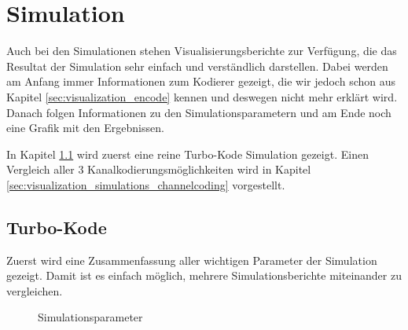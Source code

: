 \section{Simulation}
\label{sec:visualization_simulation}
Auch bei den Simulationen stehen Visualisierungsberichte zur Verfügung, die das Resultat der Simulation sehr einfach und verständlich darstellen. Dabei werden am Anfang immer Informationen zum Kodierer gezeigt, die wir jedoch schon aus Kapitel \ref{sec:visualization_encode} kennen und deswegen nicht mehr erklärt wird. Danach folgen Informationen zu den Simulationsparametern und am Ende noch eine Grafik mit den Ergebnissen.

In Kapitel \ref{sec:visualization_simulations_turbo} wird zuerst eine reine Turbo-Kode Simulation gezeigt. Einen Vergleich aller 3 Kanalkodierungsmöglichkeiten wird in Kapitel \ref{sec:visualization_simulations_channelcoding} vorgestellt.

\subsection{Turbo-Kode}
\label{sec:visualization_simulations_turbo}
Zuerst wird eine Zusammenfassung aller wichtigen Parameter der Simulation gezeigt. Damit ist es einfach möglich, mehrere Simulationsberichte miteinander zu vergleichen.

\begin{figure}[!ht]
\centering
{}
\caption{Simulationsparameter}
\label{pic:TurboSimulationParameter}
\end{figure}

